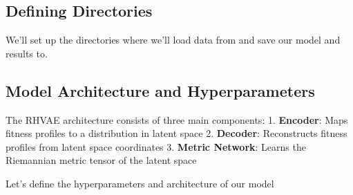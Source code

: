 \documentclass[
]{scrartcl}
\newenvironment{Shaded}{\begin{snugshade}}{\end{snugshade}}
\newcommand{\CommentTok}[1]{\textcolor[rgb]{0.37,0.37,0.37}{#1}}
\newcommand{\NormalTok}[1]{\textcolor[rgb]{0.00,0.23,0.31}{#1}}
\newcommand{\OperatorTok}[1]{\textcolor[rgb]{0.37,0.37,0.37}{#1}}
\newcommand{\SpecialCharTok}[1]{\textcolor[rgb]{0.37,0.37,0.37}{#1}}
\newcommand{\StringTok}[1]{\textcolor[rgb]{0.13,0.47,0.30}{#1}}
\begin{document}
\subsection{Defining Directories}\label{defining-directories}

We'll set up the directories where we'll load data from and save our
model and results to.

\begin{Shaded}
\end{Shaded}

\subsection{Model Architecture and
Hyperparameters}\label{model-architecture-and-hyperparameters}

The RHVAE architecture consists of three main components: 1.
\textbf{Encoder}: Maps fitness profiles to a distribution in latent
space 2. \textbf{Decoder}: Reconstructs fitness profiles from latent
space coordinates 3. \textbf{Metric Network}: Learns the Riemannian
metric tensor of the latent space

Let's define the hyperparameters and architecture of our model
\end{document}
